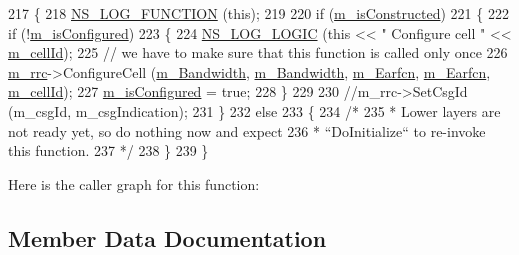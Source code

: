\begin{DoxyCode}
217 \{
218   \hyperlink{log-macros-disabled_8h_a90b90d5bad1f39cb1b64923ea94c0761}{NS\_LOG\_FUNCTION} (\textcolor{keyword}{this});
219 
220         \textcolor{keywordflow}{if} (\hyperlink{classns3_1_1MmWaveEnbNetDevice_a9811387a958dedb65e829bd3a45990be}{m\_isConstructed})
221         \{
222                 \textcolor{keywordflow}{if} (!\hyperlink{classns3_1_1MmWaveEnbNetDevice_a28db18384af32733f8246ad1cb40d2d9}{m\_isConfigured})
223                 \{
224                         \hyperlink{group__logging_ga88acd260151caf2db9c0fc84997f45ce}{NS\_LOG\_LOGIC} (\textcolor{keyword}{this} << \textcolor{stringliteral}{" Configure cell "} << 
      \hyperlink{classns3_1_1MmWaveEnbNetDevice_a84cb34f545e2556103e9a226e1ae9c3d}{m\_cellId});
225                         \textcolor{comment}{// we have to make sure that this function is called only once}
226                         \hyperlink{classns3_1_1MmWaveEnbNetDevice_ab2f138e7fc0b009e2e2876e271d9a3a4}{m\_rrc}->ConfigureCell (\hyperlink{classns3_1_1MmWaveEnbNetDevice_a8f3aef7e635063420de34477e13aca20}{m\_Bandwidth}, 
      \hyperlink{classns3_1_1MmWaveEnbNetDevice_a8f3aef7e635063420de34477e13aca20}{m\_Bandwidth}, \hyperlink{classns3_1_1MmWaveEnbNetDevice_a5b2870f793324ce95f270cb54de05152}{m\_Earfcn}, \hyperlink{classns3_1_1MmWaveEnbNetDevice_a5b2870f793324ce95f270cb54de05152}{m\_Earfcn}, \hyperlink{classns3_1_1MmWaveEnbNetDevice_a84cb34f545e2556103e9a226e1ae9c3d}{m\_cellId});
227                         \hyperlink{classns3_1_1MmWaveEnbNetDevice_a28db18384af32733f8246ad1cb40d2d9}{m\_isConfigured} = \textcolor{keyword}{true};
228                 \}
229 
230                 \textcolor{comment}{//m\_rrc->SetCsgId (m\_csgId, m\_csgIndication);}
231                 \}
232                 \textcolor{keywordflow}{else}
233                 \{
234                         \textcolor{comment}{/*}
235 \textcolor{comment}{                        * Lower layers are not ready yet, so do nothing now and expect}
236 \textcolor{comment}{                        * ``DoInitialize`` to re-invoke this function.}
237 \textcolor{comment}{                        */}
238                 \}
239         \}
\end{DoxyCode}


Here is the caller graph for this function\+:




\subsection{Member Data Documentation}
